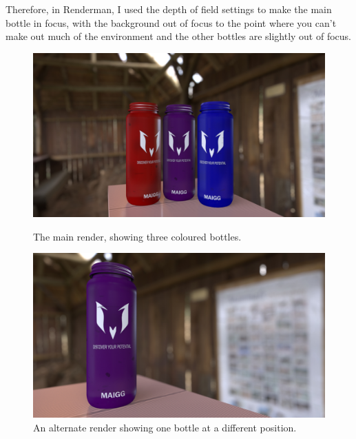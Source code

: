 \documentclass[notitlepage,12pt]{article}
\begin{document}
Therefore, in Renderman, I used the depth of field settings to make the main bottle in focus, with the background out of focus to the point where you can't make out much of the environment and the other bottles are slightly out of focus.

\begin{figure}[ht]
    \centering
    \begin{minipage}[b]{0.48\textwidth}
        \includegraphics[width=\textwidth]{render/bottle.jpg}
        \caption{The main render, showing three coloured bottles.}
        \label{fig:render}
    \end{minipage}
    \hfill
    \begin{minipage}[b]{0.48\textwidth}
        \includegraphics[width=\textwidth]{render/bottle_alternate.jpg}
        \caption{An alternate render showing one bottle at a different position.}
        \label{fig:render_alt}
    \end{minipage}
\end{figure}
\end{document}
